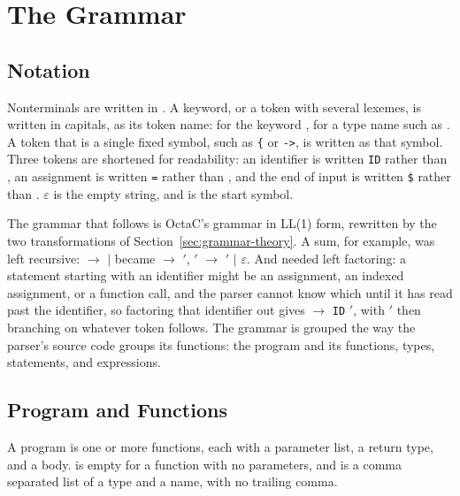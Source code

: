 \section{The Grammar}

\subsection{Notation}

Nonterminals are written in . A keyword, or a token with
several lexemes, is written in capitals, as its token name: 
for the keyword ,  for a type name such as
. A token that is a single fixed symbol, such as \texttt{\{} or
\texttt{->}, is written as that symbol. Three tokens are shortened for
readability: an identifier is written \texttt{ID} rather than
, an assignment is written \texttt{=} rather than
, and the end of input is written \texttt{\$} rather than
. $\varepsilon$ is the empty string, and 
is the start symbol.

The grammar that follows is OctaC's grammar in LL(1) form, rewritten by
the two transformations of Section~\ref{sec:grammar-theory}. A sum, for
example, was left recursive:  $\to$  
 $\mid$  became  $\to$ 
$'$, $'$ $\to$   $'$
$\mid$ $\varepsilon$. And  needed left factoring: a statement
starting with an identifier might be an assignment, an indexed
assignment, or a function call, and the parser cannot know which until it
has read past the identifier, so factoring that identifier out gives
 $\to$ \texttt{ID} $'$, with $'$ then branching
on whatever token follows. The grammar is grouped the way the parser's
source code groups its functions: the program and its functions, types,
statements, and expressions.

\subsection{Program and Functions}

A program is one or more functions, each with a parameter list, a return
type, and a body.  is empty for a function with no parameters,
and  is a comma separated list of a type and a name, with no
trailing comma.

